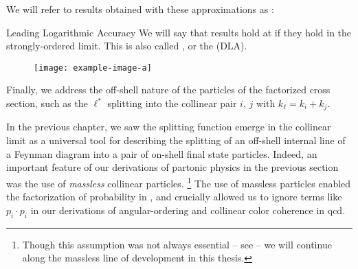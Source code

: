 We will refer to results obtained with these approximations as :

\begin{definitionbox}{Leading Logarithmic Accuracy}{}
    We will say that results hold at  if they hold in the strongly-ordered limit.
    This is also called , or the  (DLA).
\end{definitionbox}



\begin{figure}[t]
    \centering
    \texttt{[image: example-image-a]}
    \caption{}
    \label{fig:}
\end{figure}




Finally, we address the off-shell nature of the particles of the factorized cross section, such as the \(\ell^*\) splitting into the collinear pair \(i,\,j\) with \(k_\ell = k_i + k_j\).

In the previous chapter, we saw the splitting function emerge in the collinear limit as a universal tool for describing the splitting of an off-shell internal line of a Feynman diagram into a pair of on-shell final state particles.
%
Indeed, an important feature of our derivations of partonic physics in the previous section was the use of \textit{massless} collinear particles.%
\footnote{Though this assumption was not always essential -- see  -- we will continue along the massless line of development in this thesis.}
%
The use of massless particles enabled the factorization of probability in , and crucially allowed us to ignore terms like \(p_i\cdot p_i\) in our derivations of angular-ordering and collinear color coherence in \gls{qcd}.

